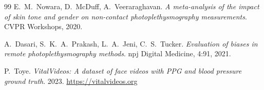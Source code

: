\documentclass[11pt,a4paper]{article}
\begin{document}
\begin{thebibliography}{99}
 E.~M.~Nowara, D.~McDuff, A.~Veeraraghavan.
\emph{A meta-analysis of the impact of skin tone and gender on non-contact
photoplethysmography measurements}. CVPR Workshops, 2020.

 A.~Dasari, S.~K.~A.~Prakash, L.~A.~Jeni, C.~S.~Tucker.
\emph{Evaluation of biases in remote photoplethysmography methods}. npj Digital
Medicine, 4:91, 2021.

 P.~Toye. \emph{VitalVideos: A dataset of face videos with PPG
and blood pressure ground truth}. 2023. \url{https://vitalvideos.org}

\end{thebibliography}
\end{document}

